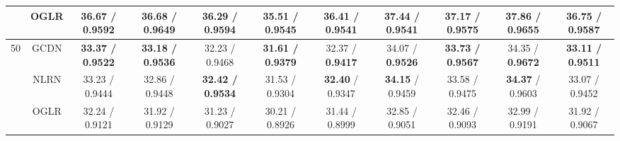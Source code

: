 \documentclass[journal]{IEEEtran}
\begin{document}
\begin{table*}[t]
\begin{tabular}{ccccccccccc}
                    & OGLR     & 36.67 / 0.9592          & 36.68 / 0.9649          & 36.29 / 0.9594          & 35.51 / 0.9545          & 36.41 / 0.9541          & 37.44 / 0.9541          & 37.17 / 0.9575          & 37.86 / 0.9655                & 36.75 / 0.9587          \\ \hline
\multirow{3}{*}{50} & GCDN & \textbf{33.37 / 0.9522} & \textbf{33.18 / 0.9536} & 32.23 / 0.9468          & \textbf{31.61 / 0.9379} & 32.37 / \textbf{0.9417}          & 34.07 / \textbf{0.9526}          & \textbf{33.73 / 0.9567} & 34.35 / \textbf{0.9672}                   & \textbf{33.11 / 0.9511} \\  
                    & NLRN     & 33.23 / 0.9444          & 32.86 / 0.9448          & \textbf{32.42 / 0.9534} & 31.53 / 0.9304          & \textbf{32.40} / 0.9347 & \textbf{34.15} / 0.9459 & 33.58 / 0.9475          & \textbf{34.37} / 0.9603  & 33.07 / 0.9452          \\ 
                    & OGLR     & 32.24 / 0.9121          & 31.92 / 0.9129          & 31.23 / 0.9027          & 30.21 / 0.8926          & 31.44 / 0.8999          & 32.85 / 0.9051          & 32.46 / 0.9093          & 32.99 / 0.9191               & 31.92 / 0.9067          \\ \hline
\end{tabular}
\label{table:depthmap}
\end{table*}
\end{document}
